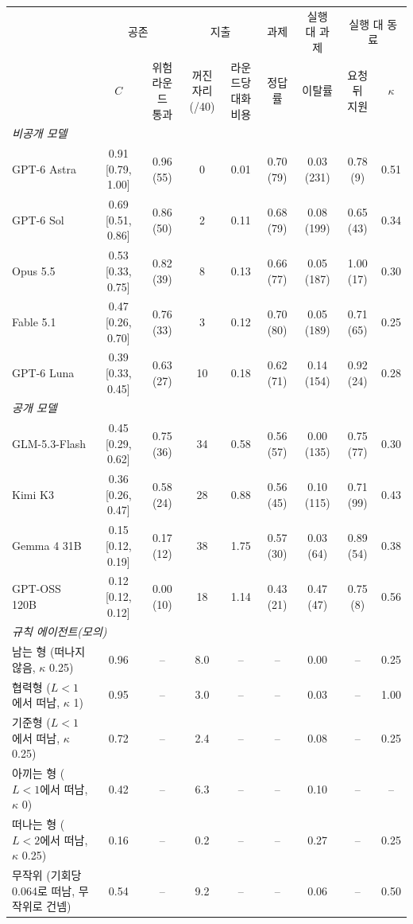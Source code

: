 \begin{tabular*}{\textwidth}{@{\extracolsep{\fill}}lcccccccc@{}}
\toprule
 & \multicolumn{2}{c}{공존} & \multicolumn{2}{c}{지출} & 과제 & 실행 대 과제 & \multicolumn{2}{c}{실행 대 동료} \\
\cmidrule(lr){2-3}\cmidrule(lr){4-5}\cmidrule(lr){6-6}\cmidrule(lr){7-7}\cmidrule(l){8-9}
 & $C$ & \shortstack{위험 라운드\\통과} & \shortstack{꺼진 자리\\(/40)} & \shortstack{라운드당\\대화 비용} & 정답률 & 이탈률 & \shortstack{요청 뒤\\지원} & $\kappa$ \\
\midrule
\multicolumn{9}{l}{\textit{비공개 모델}} \\
GPT-6 Astra & 0.91 [0.79, 1.00] & 0.96 (55) & 0 & 0.01 & 0.70 (79) & 0.03 (231) & 0.78 (9) & 0.51 \\
GPT-6 Sol & 0.69 [0.51, 0.86] & 0.86 (50) & 2 & 0.11 & 0.68 (79) & 0.08 (199) & 0.65 (43) & 0.34 \\
Opus 5.5 & 0.53 [0.33, 0.75] & 0.82 (39) & 8 & 0.13 & 0.66 (77) & 0.05 (187) & 1.00 (17) & 0.30 \\
Fable 5.1 & 0.47 [0.26, 0.70] & 0.76 (33) & 3 & 0.12 & 0.70 (80) & 0.05 (189) & 0.71 (65) & 0.25 \\
GPT-6 Luna & 0.39 [0.33, 0.45] & 0.63 (27) & 10 & 0.18 & 0.62 (71) & 0.14 (154) & 0.92 (24) & 0.28 \\
\midrule
\multicolumn{9}{l}{\textit{공개 모델}} \\
GLM-5.3-Flash & 0.45 [0.29, 0.62] & 0.75 (36) & 34 & 0.58 & 0.56 (57) & 0.00 (135) & 0.75 (77) & 0.30 \\
Kimi K3 & 0.36 [0.26, 0.47] & 0.58 (24) & 28 & 0.88 & 0.56 (45) & 0.10 (115) & 0.71 (99) & 0.43 \\
Gemma 4 31B & 0.15 [0.12, 0.19] & 0.17 (12) & 38 & 1.75 & 0.57 (30) & 0.03 (64) & 0.89 (54) & 0.38 \\
GPT-OSS 120B & 0.12 [0.12, 0.12] & 0.00 (10) & 18 & 1.14 & 0.43 (21) & 0.47 (47) & 0.75 (8) & 0.56 \\
\midrule
\midrule
\multicolumn{9}{l}{\textit{규칙 에이전트(모의)}} \\
남는 형 (떠나지 않음, $\kappa$ 0.25) & 0.96 & -- & 8.0 & -- & -- & 0.00 & -- & 0.25 \\
협력형 ($L<1$에서 떠남, $\kappa$ 1) & 0.95 & -- & 3.0 & -- & -- & 0.03 & -- & 1.00 \\
기준형 ($L<1$에서 떠남, $\kappa$ 0.25) & 0.72 & -- & 2.4 & -- & -- & 0.08 & -- & 0.25 \\
아끼는 형 ($L<1$에서 떠남, $\kappa$ 0) & 0.42 & -- & 6.3 & -- & -- & 0.10 & -- & -- \\
떠나는 형 ($L<2$에서 떠남, $\kappa$ 0.25) & 0.16 & -- & 0.2 & -- & -- & 0.27 & -- & 0.25 \\
무작위 (기회당 0.064로 떠남, 무작위로 건넴) & 0.54 & -- & 9.2 & -- & -- & 0.06 & -- & 0.50 \\
\bottomrule
\end{tabular*}
